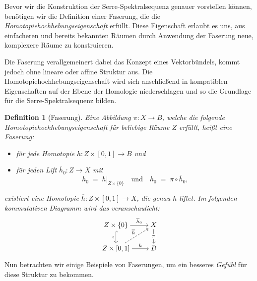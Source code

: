 \documentclass[12pt, hidelinks]{article}
\numberwithin{conj}{section}
\newtheorem{definition}[conj]{Definition}
\begin{document}
Bevor wir die Konstruktion der Serre-Spektralsequenz genauer vorstellen können, benötigen wir die Definition einer Faserung, die die \emph{Homotopiehochhebungseigenschaft} erfüllt. Diese Eigenschaft erlaubt es uns, aus einfacheren und bereits bekannten Räumen durch Anwendung der Faserung neue, komplexere Räume zu konstruieren. 

Die Faserung verallgemeinert dabei das Konzept eines Vektorbündels, kommt jedoch ohne lineare oder affine Struktur aus. Die Homotopiehochhebungseigenschaft wird sich anschließend in kompatiblen Eigenschaften auf der Ebene der Homologie niederschlagen und so die Grundlage für die Serre-Spektralsequenz bilden.

\begin{definition}[Faserung]
    Eine Abbildung \(\pi : X \to B\), welche die folgende \emph{Homotopiehochhebungseigenschaft} für beliebige Räume \(Z\) erfüllt, heißt eine \emph{Faserung}:
    \begin{itemize}[noitemsep]
        \item für jede Homotopie \(h : Z \times [0,1] \to B\) und
        \item für jeden Lift \(\overline{h}_0 : Z \to X\) mit 
              \[
                h_0 \;=\; h\vert_{Z\times \{0\}}
                \quad\text{und}\quad 
                h_0 \;=\; \pi \circ \overline{h}_0,
              \]
    \end{itemize}
    existiert eine \emph{Homotopie} \(\overline{h} : Z \times [0,1] \to X\), die genau \(h\) \emph{liftet}. Im folgenden kommutativen Diagramm wird das veranschaulicht:
    \[\begin{tikzcd}[cramped]
        {Z\times\{0\}} & X \\
        {Z\times[0,1]} & B
        \arrow["{\overline{h}_0}", from=1-1, to=1-2]
        \arrow["\iota"', hook, from=1-1, to=2-1]
        \arrow["\pi"{description}, from=1-2, to=2-2]
        \arrow["{\overline{h}}", dashed, from=2-1, to=1-2]
        \arrow["h", from=2-1, to=2-2]
        \end{tikzcd}\]
        \end{definition}
        
        \noindent
        Nun betrachten wir einige Beispiele von Faserungen, um ein besseres \emph{Gefühl} für diese Struktur zu bekommen.
        
\end{document}
